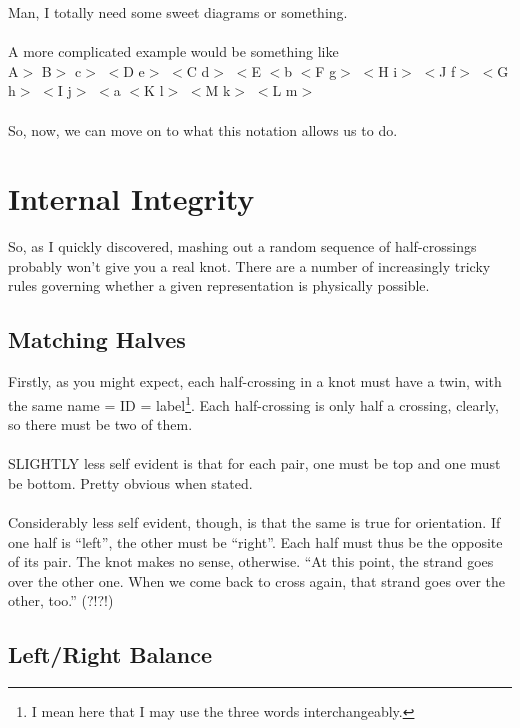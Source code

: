 \documentclass[twoside]{report}
\begin{document}
Man, I totally need some sweet diagrams or something.\\\\
A more complicated example would be something like\\
A$>$ B$>$ c$>$ $<$D e$>$ $<$C d$>$ $<$E $<$b $<$F g$>$ $<$H i$>$ $<$J f$>$ $<$G h$>$ $<$I j$>$ $<$a $<$K l$>$ $<$M k$>$ $<$L m$>$ \\\\
So, now, we can move on to what this notation allows us to do.

\section{Internal Integrity}

So, as I quickly discovered, mashing out a random sequence of half-crossings probably won't give you a real knot.  There are a number of increasingly tricky rules governing whether a given representation is physically possible.

\subsection{Matching Halves}

Firstly, as you might expect, each half-crossing in a knot must have a twin, with the same name = ID = label\footnote{I mean here that I may use the three words interchangeably.}.  Each half-crossing is only half a crossing, clearly, so there must be two of them.\\\\
SLIGHTLY less self evident is that for each pair, one must be top and one must be bottom.  Pretty obvious when stated.\\\\
Considerably less self evident, though, is that the same is true for orientation.  If one half is ``left'', the other must be ``right''.  Each half must thus be the opposite of its pair.  The knot makes no sense, otherwise.  ``At this point, the strand goes over the other one.  When we come back to cross again, that strand goes over the other, too.'' (?!?!)

\subsection{Left/Right Balance}
\end{document}
